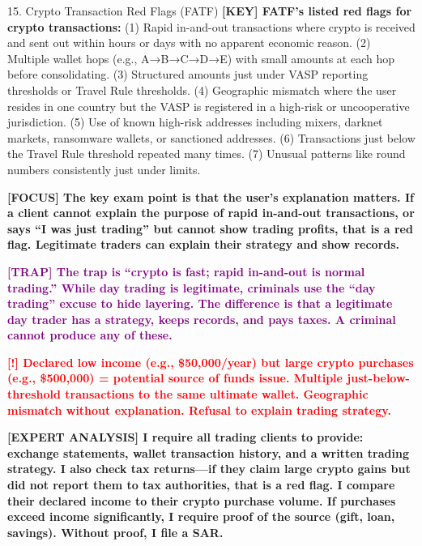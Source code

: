 \documentclass[11pt,a4paper]{beamer}
\newcommand{\redflag}[1]{\textcolor{red}{\textbf{[!] #1}}}
\newcommand{\examfocus}[1]{\textcolor{orange!80!black}{\textbf{[FOCUS] #1}}}
\newcommand{\trap}[1]{\textcolor{purple}{\textbf{[TRAP] #1}}}
\newcommand{\keyterm}[1]{\textcolor{red!80!black}{\textbf{[KEY] #1}}}
\newcommand{\expert}[1]{\textcolor{blue!70!black}{\textbf{[EXPERT ANALYSIS] #1}}}
\begin{document}
	\begin{frame}{15. Crypto Transaction Red Flags (FATF)}
		\tiny
		\keyterm{FATF's listed red flags for crypto transactions:} (1) Rapid in-and-out transactions where crypto is received and sent out within hours or days with no apparent economic reason. (2) Multiple wallet hops (e.g., A→B→C→D→E) with small amounts at each hop before consolidating. (3) Structured amounts just under VASP reporting thresholds or Travel Rule thresholds. (4) Geographic mismatch where the user resides in one country but the VASP is registered in a high-risk or uncooperative jurisdiction. (5) Use of known high-risk addresses including mixers, darknet markets, ransomware wallets, or sanctioned addresses. (6) Transactions just below the Travel Rule threshold repeated many times. (7) Unusual patterns like round numbers consistently just under limits.
		
		\vspace{0.1cm}
		\examfocus{The key exam point is that the user's explanation matters. If a client cannot explain the purpose of rapid in-and-out transactions, or says “I was just trading” but cannot show trading profits, that is a red flag. Legitimate traders can explain their strategy and show records.}
		
		\vspace{0.1cm}
		\trap{The trap is “crypto is fast; rapid in-and-out is normal trading.” While day trading is legitimate, criminals use the “day trading” excuse to hide layering. The difference is that a legitimate day trader has a strategy, keeps records, and pays taxes. A criminal cannot produce any of these.}
		
		\vspace{0.1cm}
		\redflag{Declared low income (e.g., \$50,000/year) but large crypto purchases (e.g., \$500,000) = potential source of funds issue. Multiple just-below-threshold transactions to the same ultimate wallet. Geographic mismatch without explanation. Refusal to explain trading strategy.}
		
		\vspace{0.1cm}
		\expert{I require all trading clients to provide: exchange statements, wallet transaction history, and a written trading strategy. I also check tax returns—if they claim large crypto gains but did not report them to tax authorities, that is a red flag. I compare their declared income to their crypto purchase volume. If purchases exceed income significantly, I require proof of the source (gift, loan, savings). Without proof, I file a SAR.}
	\end{frame}
	
\end{document}
